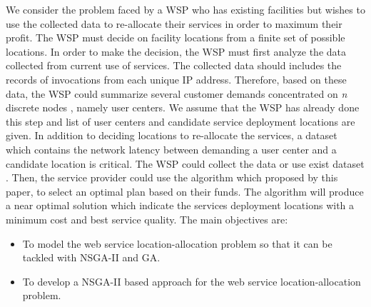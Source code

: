 \documentclass{llncs}
\begin{document}
%
%

We consider the problem faced by a WSP who has existing facilities but wishes to use the collected data to re-allocate their services in order to maximum their profit.
The WSP must decide on facility locations from a finite set of possible locations. 
In order to make the decision, the WSP must first analyze the data collected from current use of services. 
The collected data should includes the records of invocations from each unique IP address.
Therefore, based on these data, the WSP could summarize several customer demands concentrated on \textit{n} discrete nodes \cite{Aboolian}, namely user centers. 
We assume that the WSP has already done this step and list of user centers and candidate service deployment locations are given.
In addition to deciding locations to re-allocate the services, a dataset which contains the network latency between demanding a user center and a candidate location is critical. 
The WSP could collect the data or use exist dataset  \cite{6076756} \cite{5552800}. 
Then, the service provider could use the algorithm which proposed by this paper, to select an optimal plan based on their funds. 
The algorithm will produce a near optimal solution which indicate the services deployment locations with a minimum cost and best service quality.
The main objectives are:
\begin{itemize}
	\item To model the web service location-allocation problem so that it can be tackled with NSGA-II and GA.
	\item To develop a NSGA-II based approach for the web service location-allocation problem.
\end{itemize}
\end{document}
